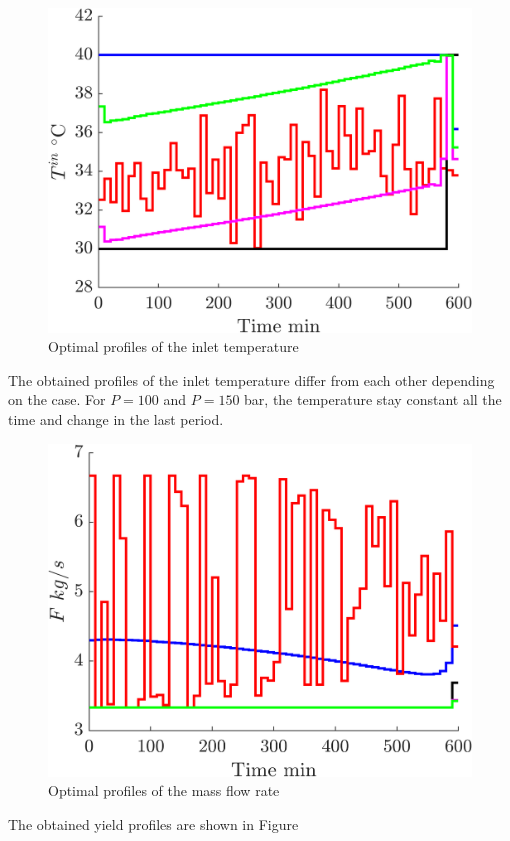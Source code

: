 \documentclass[../Article_Sensitivity_Analsysis.tex]{subfiles}
\begin{document}
	\begin{figure}[h!]
		\centering
		\includegraphics[width=0.8\columnwidth]{Figures/Results/Profiles_T.png}	
		\caption{Optimal profiles of the inlet temperature}
		\label{fig:Profiles_T}
	\end{figure}
	
	The obtained profiles of the inlet temperature differ from each other depending on the case. For $P = 100$ and $P = 150$ bar, the temperature stay constant all the time and change in the last period.
	
	\begin{figure}[h!]
		\centering
		\includegraphics[width=0.8\columnwidth]{Figures/Results/Profiles_F.png}	
		\caption{Optimal profiles of the mass flow rate}
		\label{fig:Profiles_F}
	\end{figure}
	
	The obtained yield profiles are shown in Figure 
	
\end{document}
